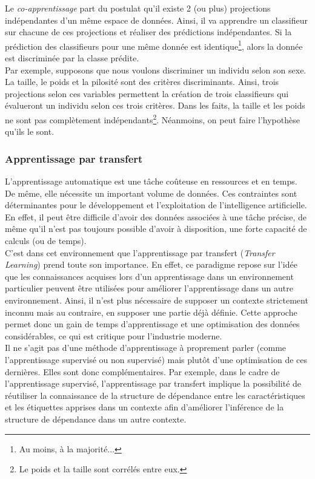 \noindent Le \textit{co-apprentissage} part du postulat qu'il existe 2 (ou plus) projections indépendantes d'un même espace de données. Ainsi, il va apprendre un classifieur sur chacune de ces projections et réaliser des prédictions indépendantes. Si la prédiction des classifieurs pour une même donnée est identique\footnote{Au moins, à la majorité...}, alors la donnée est discriminée par la classe prédite.\\

\noindent Par exemple, supposons que nous voulons discriminer un individu selon son sexe. La taille, le poids et la pilosité sont des critères discriminants. Ainsi, trois projections selon ces variables permettent la création de trois classifieurs qui évalueront un individu selon ces trois critères. Dans les faits, la taille et les poids ne sont pas complètement indépendants\footnote{Le poids et la taille sont corrélés entre eux.}. Néanmoins, on peut faire l'hypothèse qu'ils le sont.

\subsubsection{Apprentissage par transfert}
\noindent L'apprentissage automatique est une tâche coûteuse en ressources et en temps. De même, elle nécessite un important volume de données. Ces contraintes sont déterminantes pour le développement et l'exploitation de l'intelligence artificielle. En effet, il peut être difficile d'avoir des données associées à une tâche précise, de même qu'il n'est pas toujours possible d'avoir à disposition, une forte capacité de calculs (ou de temps).\\

\noindent C'est dans cet environnement que l'apprentissage par transfert (\textit{Transfer Learning}) prend toute son importance. En effet, ce paradigme repose sur l'idée que les connaissances acquises lors d'un apprentissage dans un environnement particulier peuvent être utilisées pour améliorer l'apprentissage dans un autre environnement. Ainsi, il n'est plus nécessaire de supposer un contexte strictement inconnu mais au contraire, en supposer une partie déjà définie. Cette approche permet donc un gain de temps d'apprentissage et une optimisation des données considérables, ce qui est critique pour l'industrie moderne.\\

\noindent Il ne s'agit pas d'une méthode d'apprentissage à proprement parler (comme l'apprentissage supervisé ou non supervisé) mais plutôt d'une optimisation de ces dernières. Elles sont donc complémentaires. Par exemple, dans le cadre de l'apprentissage supervisé, l'apprentissage par transfert implique la possibilité de réutiliser la connaissance de la structure de dépendance entre les caractéristiques et les étiquettes apprises dans un contexte afin d'améliorer l'inférence de la structure de dépendance dans un autre contexte.\\

